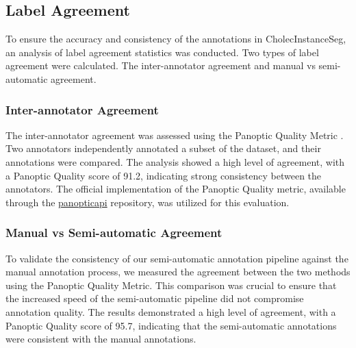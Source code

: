 \subsection*{Label Agreement}
To ensure the accuracy and consistency of the annotations in CholecInstanceSeg, an analysis of label agreement statistics was conducted. Two types of label agreement were calculated. The inter-annotator agreement and manual vs semi-automatic agreement. 

\subsubsection*{Inter-annotator Agreement}
The inter-annotator agreement was assessed using the Panoptic Quality Metric \cite{kirillov2019panoptic}. Two annotators independently annotated a subset of the dataset, and their annotations were compared. The analysis showed a high level of agreement, with a Panoptic Quality score of 91.2, indicating strong consistency between the annotators. The official implementation of the Panoptic Quality metric, available through the \href{https://github.com/cocodataset/panopticapi/tree/master}{panopticapi} repository, was utilized for this evaluation.

\subsubsection*{Manual vs Semi-automatic Agreement}
To validate the consistency of our semi-automatic annotation pipeline against the manual annotation process, we measured the agreement between the two methods using the Panoptic Quality Metric. This comparison was crucial to ensure that the increased speed of the semi-automatic pipeline did not compromise annotation quality. The results demonstrated a high level of agreement, with a Panoptic Quality score of 95.7, indicating that the semi-automatic annotations were consistent with the manual annotations.


